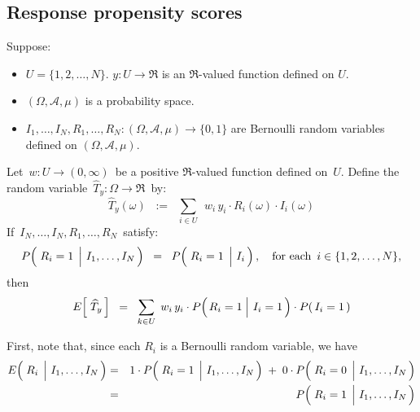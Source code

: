

\subsection{Response propensity scores}

\begin{proposition}
\mbox{}\vskip 0.1cm
\noindent
Suppose:
\begin{itemize}
\item
	$U = \{1,2,\ldots,N\}$.
	$y : U \longrightarrow \Re$ is an $\Re$-valued function defined on $U$.
\item
	$(\Omega,\mathcal{A},\mu)$ is a probability space.
\item
	$I_{1},\ldots,I_{N},R_{1},\ldots,R_{N} : (\Omega,\mathcal{A},\mu) \longrightarrow \{0,1\}$
	are Bernoulli random variables defined on $(\Omega,\mathcal{A},\mu)$. 
\end{itemize}
Let \,$w : U \longrightarrow (0,\infty)$\, be a positive $\Re$-valued function defined on \,$U$.
Define the random variable \,$\widehat{T}_{y} : \Omega \longrightarrow \Re$\, by:
\begin{equation*}
\widehat{T}_{y}(\omega)
\;\; := \;\;
	\underset{i \in U}{\sum}\,\;w_{i}\,y_{i}\cdot R_{i}(\omega) \cdot I_{i}(\omega)
\end{equation*}
If \,$I_{N},\ldots,I_{N},R_{1}, \ldots, R_{N}$\, satisfy:
\begin{equation*}
P\!\left(\,\left.\overset{{\color{white}.}}{R_{i}}=1\;\,\right\vert\,I_{1},\ldots,I_{N}\,\right)
\;\; = \;\;
	P\!\left(\,\left.\overset{{\color{white}.}}{R_{i}}=1\;\,\right\vert\,I_{i}\,\right),
\quad
\textnormal{for each \,$i \in \{1,2,\ldots,N\}$},
\end{equation*}
then
\begin{equation*}
E\!\left[\;\widehat{T}_{y}\,\right]
\;\; = \;\;
	\underset{k \in U}{\sum}\;\,w_{i}\,y_{i}
	\cdot P\!\left(\left.\overset{{\color{white}.}}{R_{i}}=1\;\right\vert\,I_{i}=1\,\right) \cdot P(\,I_{i}=1\,)
\end{equation*}
\end{proposition}
\proof
First, note that, since each $R_{i}$ is a Bernoulli random variable, we have
\begin{eqnarray*}
E\!\left(\,\left.\overset{{\color{white}.}}{R_{i}}\;\,\right\vert\,I_{1},\ldots,I_{N}\,\right)
& = &
	1 \cdot P\!\left(\,\left.\overset{{\color{white}.}}{R_{i}}=1\;\,\right\vert\,I_{1},\ldots,I_{N}\,\right)
	\; + \;
	0 \cdot P\!\left(\,\left.\overset{{\color{white}.}}{R_{i}}=0\;\,\right\vert\,I_{1},\ldots,I_{N}\,\right)
\\
& = &
	P\!\left(\,\left.\overset{{\color{white}.}}{R_{i}}=1\;\,\right\vert\,I_{1},\ldots,I_{N}\,\right)
\end{eqnarray*}

